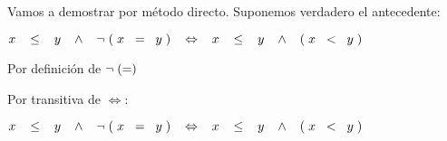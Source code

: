 \documentclass[12pt]{article}
\begin{document}
{}
\newpage
Vamos a demostrar por método directo. Suponemos verdadero el antecedente: 

\begin{center}
    $x \hspace{0.3cm} \leq \hspace{0.3cm} y \hspace{0.3cm} \wedge \hspace{0.3cm}  \neg \hspace{0.1cm} (\hspace{0.1cm}x\hspace{0.2cm}=\hspace{0.2cm}y\hspace{0.1cm}) \hspace{0.3cm} \Leftrightarrow \hspace{0.3cm} x \hspace{0.3cm} \leq \hspace{0.3cm} y \hspace{0.3cm} \wedge \hspace{0.3cm} (\hspace{0.1cm}x\hspace{0.2cm}<\hspace{0.2cm}y\hspace{0.1cm})$ 
    
    \vspace{1cm}
    
    \hspace{9cm}Por definición de $\neg \hspace{0.1cm}(=)$
\end{center}
\vspace{1cm}

Por transitiva de $\Leftrightarrow$:\\

\begin{center}
    $x \hspace{0.3cm} \leq \hspace{0.3cm} y \hspace{0.3cm} \wedge \hspace{0.3cm}  \neg \hspace{0.1cm} (\hspace{0.1cm}x\hspace{0.2cm}=\hspace{0.2cm}y\hspace{0.1cm}) \hspace{0.3cm} \Leftrightarrow \hspace{0.3cm} x \hspace{0.3cm} \leq \hspace{0.3cm} y \hspace{0.3cm} \wedge \hspace{0.3cm} (\hspace{0.1cm}x\hspace{0.2cm}<\hspace{0.2cm}y\hspace{0.1cm})$ 
\end{center}\vspace{0.1cm}
\end{document}
